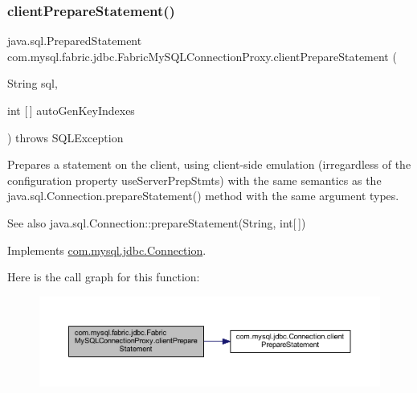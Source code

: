 \subsubsection{\texorpdfstring{client\+Prepare\+Statement()}{clientPrepareStatement()}\hspace{0.1cm}{\footnotesize\ttfamily [4/6]}}
{\footnotesize\ttfamily java.\+sql.\+Prepared\+Statement com.\+mysql.\+fabric.\+jdbc.\+Fabric\+My\+S\+Q\+L\+Connection\+Proxy.\+client\+Prepare\+Statement (\begin{DoxyParamCaption}\item[{String}]{sql,  }\item[{int \mbox{[}$\,$\mbox{]}}]{auto\+Gen\+Key\+Indexes }\end{DoxyParamCaption}) throws S\+Q\+L\+Exception}

Prepares a statement on the client, using client-\/side emulation (irregardless of the configuration property \textquotesingle{}use\+Server\+Prep\+Stmts\textquotesingle{}) with the same semantics as the java.\+sql.\+Connection.\+prepare\+Statement() method with the same argument types.

\begin{DoxySeeAlso}{See also}
java.\+sql.\+Connection\+::prepare\+Statement(\+String, int\mbox{[}$\,$\mbox{]}) 
\end{DoxySeeAlso}


Implements \mbox{\hyperlink{interfacecom_1_1mysql_1_1jdbc_1_1_connection_a0a5607f53ef9d376f1ff02fcffd038bf}{com.\+mysql.\+jdbc.\+Connection}}.

Here is the call graph for this function\+:\nopagebreak
\begin{figure}[H]
\begin{center}
\leavevmode
\includegraphics[width=350pt]{classcom_1_1mysql_1_1fabric_1_1jdbc_1_1_fabric_my_s_q_l_connection_proxy_ad03b65c83fb47a910ad616cc4fd360dd_cgraph}
\end{center}
\end{figure}
\mbox{\label{classcom_1_1mysql_1_1fabric_1_1jdbc_1_1_fabric_my_s_q_l_connection_proxy_af87ed2e4ae29bbf51b90adf202a61c49}} 
